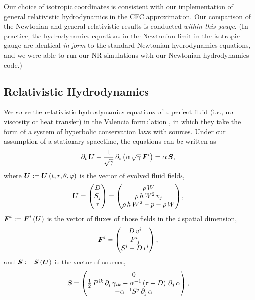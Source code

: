 Our choice of isotropic coordinates is consistent with our implementation of general
relativistic hydrodynamics in the CFC approximation.
Our comparison of the Newtonian and general relativistic results is conducted
{\em within this gauge}.
(In practice, the hydrodynamics equations in the Newtonian limit in the isotropic gauge
are identical {\em in form} to the standard Newtonian hydrodynamics equations,
and we were able to run our NR simulations with our Newtonian hydrodynamics code.)

\subsection{Relativistic Hydrodynamics}

We solve the relativistic hydrodynamics equations
of a perfect fluid (i.e., no viscosity or heat transfer)
in the Valencia formulation
\citep{bfi1997,rz2013}, in which they take the form of a
system of hyperbolic conservation laws with sources. Under our assumption of
a stationary spacetime, the equations can be written as
\begin{equation}\label{eq.cLaws}
  \partial_{t}\,\boldsymbol{U}
  +\frac{1}{\sqrt{\gamma}}\,
  \partial_{i}\left(\alpha\,\sqrt{\gamma}\,\boldsymbol{F}^{i}\right)=\alpha\,\boldsymbol{S},
\end{equation}
where $\boldsymbol{U}:=\boldsymbol{U}\left(t,r,\theta,\varphi\right)$
is the vector of evolved fluid fields,
\begin{equation}
  \boldsymbol{U}
  =\begin{pmatrix}
  D\\
  S_{j}\\
  \tau
  \end{pmatrix}
  =\begin{pmatrix}
  \rho\,W\\
  \rho\,h\,W^{2}\,v_{j}\\
  \rho\,h\,W^{2}-p-\rho\,W
  \end{pmatrix},
\end{equation}
$\boldsymbol{F}^{i}:=\boldsymbol{F}^{i}\left(\boldsymbol{U}\right)$ is the vector of fluxes of those
fields in the $i$\th{} spatial dimension,
\begin{equation}
  \boldsymbol{F}^{i}
  =\begin{pmatrix}
  D\,v^{i}\\
  P^{i}_{~j}\\
  S^{i}-D\,v^{i}
  \end{pmatrix},
\end{equation}
and $\boldsymbol{S}:=\boldsymbol{S}\left(\boldsymbol{U}\right)$ is the vector of sources,
\begin{equation}
  \boldsymbol{S}
  =\begin{pmatrix}
  0\\
  \frac{1}{2}\,P^{ik}\,\partial_{j}\,\gamma_{ik}
  -\alpha^{-1}\left(\tau+D\right)\,\partial_{j}\,\alpha\\
  -\alpha^{-1}S^{j}\,\partial_{j}\,\alpha
  \end{pmatrix},
\end{equation}
